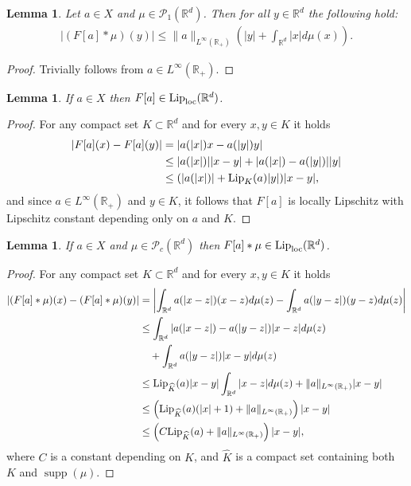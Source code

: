 \documentclass[A4paper,11pt]{article}
\newtheorem{lemma}[theorem]{Lemma}
\theoremstyle{definition}
\newcommand{\Lip}{\textup{Lip}}
\newcommand{\loc}{\textup{loc}}
\newcommand{\R}{\mathbb{R}}
\newcommand{\PP}{\mathcal{P}_1}
\DeclareMathOperator{\supp}{supp}
\begin{document}
\begin{lemma}\label{p-estkernel}
Let $a\in X$ and $\mu \in \PP(\R^d)$. Then for all $y \in \R^d$ the following hold:
\begin{align*}
|(F[a] * \mu)(y)| \leq \|a\|_{L^{\infty}(\R_+)}\left( | y | + \int_{\R^d} | x | d\mu(x) \right).
\end{align*}
\end{lemma}
\begin{proof}
Trivially follows from $a \in L^{\infty}(\R_+)$.
\end{proof}

\begin{lemma}\label{p-Floclip}
If $a\in X$ then $F[a] \in \Lip_\loc(\R^d)$.
\end{lemma}
\begin{proof}
For any compact set $K \subset \R^d$ and for every $x,y \in K$ it holds
\begin{align*}
|F[a](x) - F[a](y)| &= |a(|x|)x - a(|y|)y| \\
&\leq |a(|x|)| |x-y| + |a(|x|) - a(|y|)| |y| \\
&\leq (|a(|x|)| + \Lip_K(a) |y|) |x-y|,
\end{align*}
and since $a \in L^{\infty}(\R_+)$ and $y \in K$, it follows that $F[a]$ is locally Lipschitz with Lipschitz constant depending only on $a$ and $K$.
\end{proof}

\begin{lemma}\label{p-Fmuloclip}
If $a\in X$ and $\mu \in \mathcal{P}_c(\R^d)$ then $F[a]*\mu \in \Lip_{\loc}(\R^d)$.
\end{lemma}
\begin{proof}
For any compact set $K \subset \R^d$ and for every $x,y \in K$ it holds
\begin{align*}
|(F[a]*\mu)(x) - (F[a]*\mu)(y)| &= \left|\int_{\R^d}a(|x-z|)(x-z)d\mu(z) - \int_{\R^d}a(|y-z|)(y-z)d\mu(z)\right| \\
&\leq \int_{\R^d}|a(|x-z|)-a(|y-z|)|x-z|d\mu(z)\\
&\quad+ \int_{\R^d}a(|y-z|)|x-y|d\mu(z) \\
&\leq \Lip_{\widehat{K}}(a)|x-y| \int_{\R^d}|x-z|d\mu(z) + \|a\|_{L^{\infty}(\R_+)}|x-y| \\
&\leq \left(\Lip_{\widehat{K}}(a)(|x| + 1)+ \|a\|_{L^{\infty}(\R_+)}\right)|x-y| \\
& \leq \left(C\Lip_{\widehat{K}}(a) + \|a\|_{L^{\infty}(\R_+)} \right)|x-y|,
\end{align*}
where $C$ is a constant depending on $K$, and $\widehat{K}$ is a compact set containing both $K$ and $\supp(\mu)$.
\end{proof}
\end{document}
